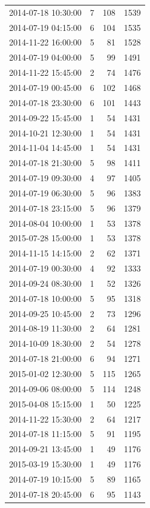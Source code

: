 \begin{tabular}{lrrr}
2014-07-18 10:30:00 & 7 & 108 & 1539 \\
2014-07-19 04:15:00 & 6 & 104 & 1535 \\
2014-11-22 16:00:00 & 5 & 81 & 1528 \\
2014-07-19 04:00:00 & 5 & 99 & 1491 \\
2014-11-22 15:45:00 & 2 & 74 & 1476 \\
2014-07-19 00:45:00 & 6 & 102 & 1468 \\
2014-07-18 23:30:00 & 6 & 101 & 1443 \\
2014-09-22 15:45:00 & 1 & 54 & 1431 \\
2014-10-21 12:30:00 & 1 & 54 & 1431 \\
2014-11-04 14:45:00 & 1 & 54 & 1431 \\
2014-07-18 21:30:00 & 5 & 98 & 1411 \\
2014-07-19 09:30:00 & 4 & 97 & 1405 \\
2014-07-19 06:30:00 & 5 & 96 & 1383 \\
2014-07-18 23:15:00 & 5 & 96 & 1379 \\
2014-08-04 10:00:00 & 1 & 53 & 1378 \\
2015-07-28 15:00:00 & 1 & 53 & 1378 \\
2014-11-15 14:15:00 & 2 & 62 & 1371 \\
2014-07-19 00:30:00 & 4 & 92 & 1333 \\
2014-09-24 08:30:00 & 1 & 52 & 1326 \\
2014-07-18 10:00:00 & 5 & 95 & 1318 \\
2014-09-25 10:45:00 & 2 & 73 & 1296 \\
2014-08-19 11:30:00 & 2 & 64 & 1281 \\
2014-10-09 18:30:00 & 2 & 54 & 1278 \\
2014-07-18 21:00:00 & 6 & 94 & 1271 \\
2015-01-02 12:30:00 & 5 & 115 & 1265 \\
2014-09-06 08:00:00 & 5 & 114 & 1248 \\
2015-04-08 15:15:00 & 1 & 50 & 1225 \\
2014-11-22 15:30:00 & 2 & 64 & 1217 \\
2014-07-18 11:15:00 & 5 & 91 & 1195 \\
2014-09-21 13:45:00 & 1 & 49 & 1176 \\
2015-03-19 15:30:00 & 1 & 49 & 1176 \\
2014-07-19 10:15:00 & 5 & 89 & 1165 \\
2014-07-18 20:45:00 & 6 & 95 & 1143 \\

\end{tabular}
